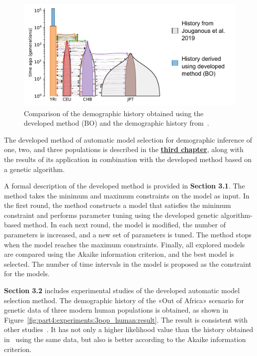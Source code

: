\begin{figure}[t]
\centering
\includegraphics[width=0.8\linewidth]{images_experiments/bo_human/4pops_result_en.pdf}
\caption{Comparison of the demographic history obtained using the developed method (BO) and the demographic history from~\cite{jouganous2017inferring}.}
\end{figure}

The developed method of automatic model selection for demographic inference of one, two, and three populations is described in the \underline{\textbf{third chapter}}, along with the results of its application in combination with the developed method based on a genetic algorithm.

A formal description of the developed method is provided in \textbf{Section 3.1}.
The method takes the minimum and maximum constraints on the model as input.
In the first round, the method constructs a model that satisfies the minimum constraint and performs parameter tuning using the developed genetic algorithm-based method.
In each next round, the model is modified, the number of parameters is increased, and a new set of parameters is tuned. 
The method stops when the model reaches the maximum constraints.
Finally, all explored models are compared using the Akaike information criterion, and the best model is selected.
The number of time intervals in the model is proposed as the constraint for the models.



\textbf{Section 3.2} includes experimental studies of the developed automatic model selection method.
The demographic history of the «Out of Africa» scenario for genetic data of three modern human populations is obtained, as shown in Figure~\ref{fig:part4:experiments:3pop_human:result}. The result is consistent with other studies~\cite{gutenkunst2009inferring, schraiber2015methods, nielsen2007recent}.
It has not only a higher likelihood value than the history obtained in~\cite{gutenkunst2009inferring} using the same data, but also is better according to the Akaike information criterion.

